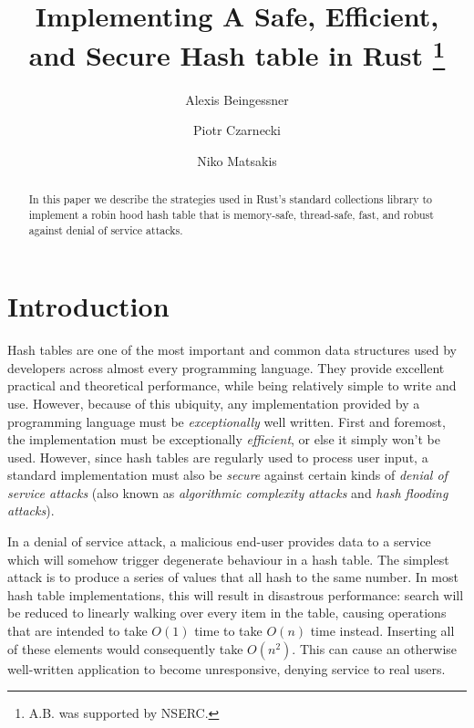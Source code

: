 \documentclass{cccg13}
\title{Implementing A Safe, Efficient, and Secure Hash table in Rust \thanks{A.B. was supported by NSERC.}}
\author{
Alexis Beingessner\footnotemark[2]
\and
Piotr Czarnecki
\and
Niko Matsakis
}
\begin{document}
\thispagestyle{empty}
\maketitle


\begin{abstract}
In this paper we describe the strategies used in Rust's standard collections library to implement a robin hood hash table that is memory-safe, thread-safe, fast, and robust against denial of service attacks.
\end{abstract}







\section{Introduction}   \label{secintro}

Hash tables are one of the most important and common data structures used by
developers across almost every programming language. They provide excellent
practical and theoretical performance, while being relatively simple to write
and use. However, because of this ubiquity, any implementation provided by a
programming language must be \emph{exceptionally} well written. First and
foremost, the implementation must be exceptionally \emph{efficient}, or else
it simply won't be used. However, since hash tables are regularly used to
process user input, a standard implementation must also be \emph{secure}
against certain kinds of \emph{denial of service attacks} (also known as
\emph{algorithmic complexity attacks} and \emph{hash flooding attacks}).

In a denial of service attack, a malicious end-user provides data to a service
which will somehow trigger degenerate behaviour in a hash table. The simplest
attack is to produce a series of values that all hash to the same number. In
most hash table implementations, this will result in disastrous performance:
search will be reduced to linearly walking over every item in the table,
causing operations that are intended to take $O(1)$ time to take $O(n)$ time
instead. Inserting all of these elements would consequently take
$O(n^2)$. This can cause an otherwise well-written application to become
unresponsive, denying service to real users.
\end{document}
